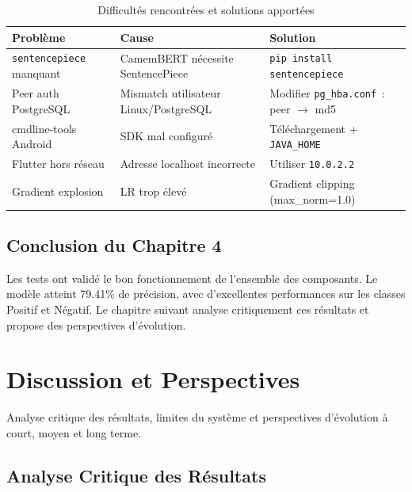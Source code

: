 \documentclass[12pt,a4paper,oneside]{report}
\begin{document}
\begin{table}[H]
\centering
\caption{Difficultés rencontrées et solutions apportées}
\label{tab:difficultés}
\renewcommand{\arraystretch}{1.5}
\begin{tabular}{p{3.5cm} p{4.5cm} p{4.5cm}}
\toprule
\rowcolor{bleuprincipal!15}
\textbf{Problème} & \textbf{Cause} & \textbf{Solution} \\
\midrule
\texttt{sentencepiece} manquant & CamemBERT nécessite SentencePiece & \texttt{pip install sentencepiece} \\
\rowcolor{gray!8}
Peer auth PostgreSQL & Mismatch utilisateur Linux/PostgreSQL & Modifier \texttt{pg\_hba.conf}~: peer $\to$ md5 \\
cmdline-tools Android & SDK mal configuré & Téléchargement + \texttt{JAVA\_HOME} \\
\rowcolor{gray!8}
Flutter hors réseau & Adresse localhost incorrecte & Utiliser \texttt{10.0.2.2} \\
Gradient explosion & LR trop élevé & Gradient clipping (max\_norm=1.0) \\
\bottomrule
\end{tabular}
\end{table}

\section*{Conclusion du Chapitre 4}
Les tests ont validé le bon fonctionnement de l'ensemble des composants.
Le modèle atteint 79.41\% de précision, avec d'excellentes performances
sur les classes Positif et Négatif. Le chapitre suivant analyse critiquement
ces résultats et propose des perspectives d'évolution.
\cleardoublepage

\chapter{Discussion et Perspectives}

\begin{infobox}
Analyse critique des résultats, limites du système et perspectives
d'évolution à court, moyen et long terme.
\end{infobox}

\section{Analyse Critique des Résultats}
\end{document}
